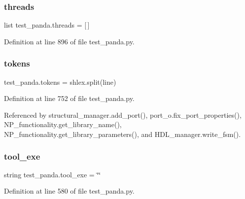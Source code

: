 \subsubsection{\texorpdfstring{threads}{threads}}
{\footnotesize\ttfamily list test\+\_\+panda.\+threads = \mbox{[}$\,$\mbox{]}}



Definition at line 896 of file test\+\_\+panda.\+py.

\mbox{\label{namespacetest__panda_a2d26dd74cc87c155c90e49e45383a469}} 
\subsubsection{\texorpdfstring{tokens}{tokens}}
{\footnotesize\ttfamily test\+\_\+panda.\+tokens = shlex.\+split(line)}



Definition at line 752 of file test\+\_\+panda.\+py.



Referenced by structural\+\_\+manager.\+add\+\_\+port(), port\+\_\+o.\+fix\+\_\+port\+\_\+properties(), N\+P\+\_\+functionality.\+get\+\_\+library\+\_\+name(), N\+P\+\_\+functionality.\+get\+\_\+library\+\_\+parameters(), and H\+D\+L\+\_\+manager.\+write\+\_\+fsm().

\mbox{\label{namespacetest__panda_aa66614fd26a88bcc42712e9cd7b87797}} 
\subsubsection{\texorpdfstring{tool\+\_\+exe}{tool\_exe}}
{\footnotesize\ttfamily string test\+\_\+panda.\+tool\+\_\+exe = \char`\"{}\char`\"{}}



Definition at line 580 of file test\+\_\+panda.\+py.

\mbox{\label{namespacetest__panda_a07b1c4c41270519a99a4ebc617117a0c}} 
